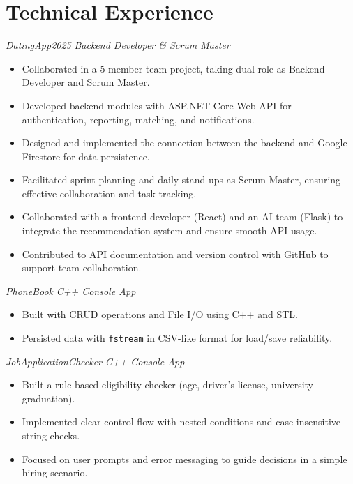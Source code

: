 \documentclass[10pt,a4paper]{extarticle}
\begin{document}
\section{Technical Experience}
\textit{DatingApp2025} \hspace{3cm} \textit{Backend Developer \& Scrum Master}\\
\begin{itemize}[leftmargin=*,noitemsep,topsep=0pt]
    \item Collaborated in a 5-member team project, taking dual role as Backend Developer and Scrum Master.
    \item Developed backend modules with ASP.NET Core Web API for authentication, reporting, matching, and notifications.
    \item Designed and implemented the connection between the backend and Google Firestore for data persistence.
    \item Facilitated sprint planning and daily stand-ups as Scrum Master, ensuring effective collaboration and task tracking.
    \item Collaborated with a frontend developer (React) and an AI team (Flask) to integrate the recommendation system and ensure smooth API usage.
    \item Contributed to API documentation and version control with GitHub to support team collaboration.
\end{itemize}
\vspace{0.5cm} 
\textit{PhoneBook} \hspace{3cm} \textit{C++ Console App}
\begin{itemize}[leftmargin=*,noitemsep,topsep=0pt]
    \item Built with CRUD operations and File I/O using C++ and STL.
    \item Persisted data with \texttt{fstream} in CSV-like format for load/save reliability.
\end{itemize}
\vspace{0.5cm} 
\textit{JobApplicationChecker} \hspace{3cm} \textit{C++ Console App}\\
\begin{itemize}[leftmargin=*,noitemsep,topsep=0pt]
    \item Built a rule-based eligibility checker (age, driver’s license, university graduation).
    \item Implemented clear control flow with nested conditions and case-insensitive string checks.
    \item Focused on user prompts and error messaging to guide decisions in a simple hiring scenario.
\end{itemize}
\end{document}

